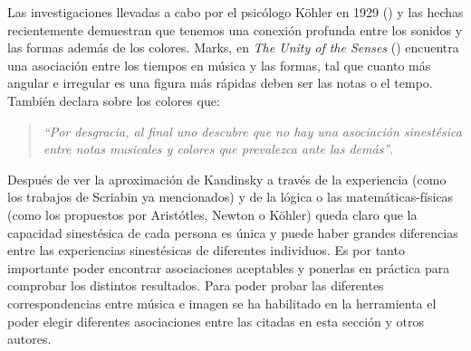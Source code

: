 Las investigaciones llevadas a cabo por el psicólogo Köhler en 1929 (\cite{GestaltPsychology}) y las hechas recientemente demuestran que tenemos una conexión profunda entre los sonidos y las formas además de los colores. Marks, en \emph{The Unity of the Senses} (\cite{TheUnityOfTheSenses}) encuentra una asociación entre los tiempos en música y las formas, tal que cuanto más angular e irregular es una figura más rápidas deben ser las notas o el tempo. También declara sobre los colores que:
\begin{quote}
\emph{``Por desgracia, al final uno descubre que no hay una asociación sinestésica entre notas musicales y colores que prevalezca ante las demás''}.\\
\end{quote}

\color{blue} 
Después de ver la aproximación de Kandinsky a través de la experiencia (como los trabajos de Scriabin ya mencionados) y de la lógica o las matemáticas-físicas (como los propuestos por Aristótles, Newton o Köhler) queda claro que la capacidad sinestésica de cada persona es única y puede haber grandes diferencias entre las experiencias sinestésicas de diferentes individuos. \color{black} Es por tanto importante poder encontrar asociaciones aceptables y ponerlas en práctica para comprobar los distintos resultados. Para poder probar las diferentes correspondencias entre música e imagen se ha habilitado en la herramienta el poder elegir diferentes asociaciones entre las citadas en esta sección y otros autores.